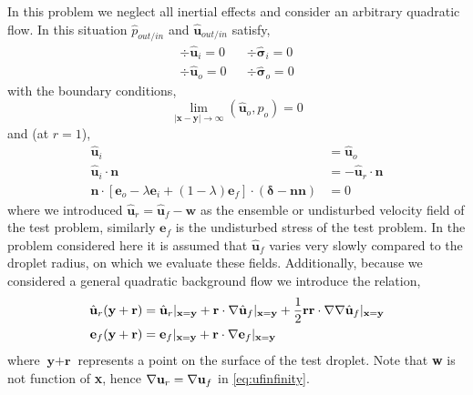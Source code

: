 In this problem we neglect all inertial effects and consider an arbitrary quadratic flow. 
In this situation $\hat{p}_{out/in}$ and $\hat{\textbf{u}}_{out/in}$ satisfy,
\begin{align}
    \div \hat{\textbf{u}}_{i} = 0 
    && \div\hat{\bm\sigma}_{i}  = 0 
    \label{eq:momentum_in_s}
    \\
    \div \hat{\textbf{u}}_{o} = 0 
    &&\div\hat{\bm\sigma}_{o}  = 0 
    \label{eq:momentum_out_s}
\end{align}
with the boundary conditions, 
\begin{equation}
    \lim_{|\textbf{x}-\textbf{y}|\to \infty}(\hat{\textbf{u}}_{o},p_{o}) = 0 
\end{equation}
and (at $r=1$),
\begin{align}
    \hat{\textbf{u}}_{i} &= \hat{\textbf{u}}_{o}\\
    \hat{\textbf{u}}_{i} \cdot \textbf{n} &= - \hat{\textbf{u}}_r \cdot \textbf{n}
    \label{eq:normal_vel_s}
    \\
    \mathbf{n}\cdot [\textbf{e}_{o} - \lambda \textbf{e}_{i} + (1-\lambda) \textbf{e}_f]\cdot (\bm\delta - \textbf{nn})
    &=
    0
\end{align}
where we introduced $\hat{\textbf{u}}_r = \hat{\textbf{u}}_f - \textbf{w}$ as the ensemble or undisturbed velocity field of the test problem, similarly $\textbf{e}_f$ is the undisturbed stress of the test problem. 
In the problem considered here it is assumed that $\hat{\textbf{u}}_f$ varies very slowly compared to the droplet radius, on which we evaluate these fields. 
Additionally, because we considered a general quadratic background flow we introduce the relation, 
\begin{align}
    \hat{\textbf{u}}_r(\textbf{y}+ \textbf{r}) 
    &=  \hat{\textbf{u}}_r|_{\textbf{x}=\textbf{y}}
    +  \textbf{r} \cdot  \grad\hat{\textbf{u}}_f|_{\textbf{x}=\textbf{y}}
    +  \frac{1}{2}\textbf{rr} \cdot  \grad\grad\hat{\textbf{u}}_f|_{\textbf{x}=\textbf{y}}
    \label{eq:ufinfinity}
    \\
    \textbf{e}_f(\textbf{y}+\textbf{r})
    &=   
    \textbf{e}_f|_{\textbf{x}=\textbf{y}}
    + \textbf{r} \cdot  \grad \textbf{e}_f|_{\textbf{x}=\textbf{y}}
\end{align}
where $\textbf{y}+ \textbf{r}$ represents a point on the surface of the test droplet. 
Note that \textbf{w} is not function of \textbf{x}, hence $\mathbf{\nabla} \textbf{u}_r = \mathbf{\nabla} \textbf{u}_f$  in \ref{eq:ufinfinity}. 



